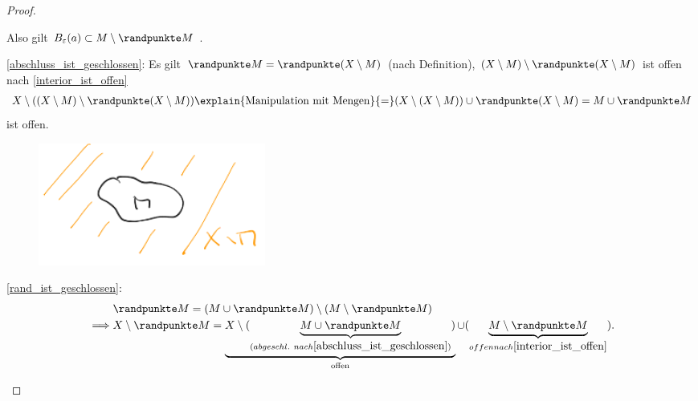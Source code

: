 \begin{proof}
\begin{proofdescription}
        Also gilt \( B_\varepsilon(a)\subset M\setminus \randpunkte M \) \timplies \Beh.
        \item[\ref{abschluss_ist_geschlossen}:] Es gilt \( \randpunkte M=\randpunkte (X\setminus M) \) (nach Definition), \( (X\setminus M)\setminus \randpunkte(X\setminus M) \) ist offen nach \ref{interior_ist_offen} \timplies \begin{align*}
            X\setminus ((X\setminus M)\setminus \randpunkte(X\setminus M))\explain{\text{Manipulation mit Mengen}}{=}(X\setminus(X\setminus M))\cup \randpunkte (X\setminus M)=M\cup \randpunkte M
        \end{align*}
        ist offen.
        \begin{figure}[H]
            \centering
            \includegraphics[width=0.5\linewidth]{figures/menge_und_komplement}
            \label{fig:menge_und_komplement}
        \end{figure}
        \item[\ref{rand_ist_geschlossen}:]
        \begin{align*}
            &\randpunkte M=(M\cup \randpunkte M)\setminus (M\setminus \randpunkte M)\\
            \implies &X\setminus \randpunkte M=\underbrace{X\setminus(\underbrace{M\cup \randpunkte M}_{\text(abgeschl.\ nach \ref{abschluss_ist_geschlossen})})}_{\text{offen}}\cup (\underbrace{M\setminus \randpunkte M}_{offen nach \ref{interior_ist_offen}}).
        \end{align*} 
    \end{proofdescription}
\end{proof}

